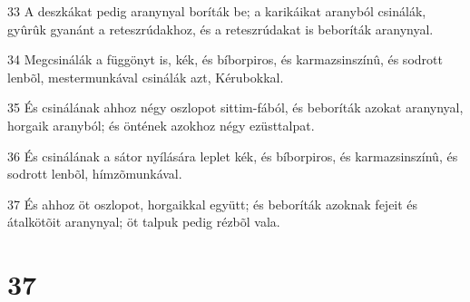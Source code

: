 \par 33 A deszkákat pedig aranynyal boríták be; a karikáikat aranyból csinálák, gyûrûk gyanánt a reteszrúdakhoz, és a reteszrúdakat is beboríták aranynyal.
\par 34 Megcsinálák a függönyt is, kék, és bíborpiros, és karmazsinszínû, és sodrott lenbõl, mestermunkával csinálák azt, Kérubokkal.
\par 35 És csinálának ahhoz négy oszlopot sittim-fából, és beboríták azokat aranynyal, horgaik aranyból; és öntének azokhoz négy ezüsttalpat.
\par 36 És csinálának a sátor nyílására leplet kék, és bíborpiros, és karmazsinszínû, és sodrott lenbõl, hímzõmunkával.
\par 37 És ahhoz öt oszlopot, horgaikkal együtt; és beboríták azoknak fejeit és átalkötõit aranynyal; öt talpuk pedig rézbõl vala.

\chapter{37}

